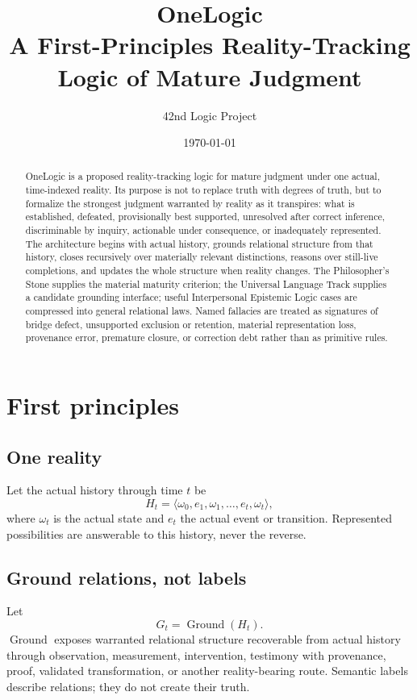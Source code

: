 \documentclass[11pt]{article}
\title{\textbf{OneLogic}\\A First-Principles Reality-Tracking Logic of Mature Judgment}
\author{42nd Logic Project}
\date{\today}
\begin{document}
\maketitle

\begin{abstract}
OneLogic is a proposed reality-tracking logic for mature judgment under one actual, time-indexed reality. Its purpose is not to replace truth with degrees of truth, but to formalize the strongest judgment warranted by reality as it transpires: what is established, defeated, provisionally best supported, unresolved after correct inference, discriminable by inquiry, actionable under consequence, or inadequately represented. The architecture begins with actual history, grounds relational structure from that history, closes recursively over materially relevant distinctions, reasons over still-live completions, and updates the whole structure when reality changes. The Philosopher's Stone supplies the material maturity criterion; the Universal Language Track supplies a candidate grounding interface; useful Interpersonal Epistemic Logic cases are compressed into general relational laws. Named fallacies are treated as signatures of bridge defect, unsupported exclusion or retention, material representation loss, provenance error, premature closure, or correction debt rather than as primitive rules.
\end{abstract}

\section{First principles}

\subsection{One reality}
Let the actual history through time $t$ be
\[
H_t=\langle \omega_0,e_1,\omega_1,\ldots,e_t,\omega_t\rangle,
\]
where $\omega_t$ is the actual state and $e_t$ the actual event or transition. Represented possibilities are answerable to this history, never the reverse.

\subsection{Ground relations, not labels}
Let
\[
G_t=\operatorname{Ground}(H_t).
\]
$\operatorname{Ground}$ exposes warranted relational structure recoverable from actual history through observation, measurement, intervention, testimony with provenance, proof, validated transformation, or another reality-bearing route. Semantic labels describe relations; they do not create their truth.
\end{document}
